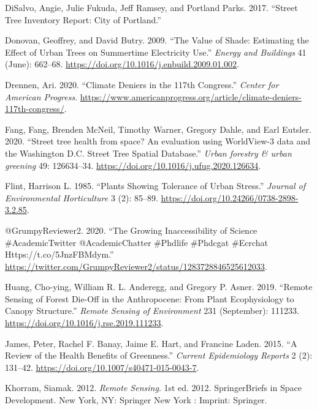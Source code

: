 \documentclass[12pt,twoside]{reedthesis}
\newlength{\cslhangindent}
\newenvironment{CSLReferences}[2] %
 {%
  \setlength{\parindent}{0pt}
  \ifodd #1 \everypar{\setlength{\hangindent}{\cslhangindent}}\ignorespaces\fi
  \ifnum #2 > 0
  \setlength{\parskip}{#2\baselineskip}
  \fi
 }%
 {}
\begin{document}
\begin{CSLReferences}{1}{0}
\leavevmode{}%
DiSalvo, Angie, Julie Fukuda, Jeff Ramsey, and Portland Parks. 2017. {``Street Tree Inventory Report: City of Portland.''}

\leavevmode{}%
Donovan, Geoffrey, and David Butry. 2009. {``The Value of Shade: Estimating the Effect of Urban Trees on Summertime Electricity Use.''} \emph{Energy and Buildings} 41 (June): 662--68. \url{https://doi.org/10.1016/j.enbuild.2009.01.002}.

\leavevmode{}%
Drennen, Ari. 2020. {``Climate Deniers in the 117th Congress.''} \emph{Center for American Progress}. \url{https://www.americanprogress.org/article/climate-deniers-117th-congress/}.

\leavevmode{}%
Fang, Fang, Brenden McNeil, Timothy Warner, Gregory Dahle, and Earl Eutsler. 2020. {``Street tree health from space? An evaluation using WorldView-3 data and the Washington D.C. Street Tree Spatial Database.''} \emph{Urban forestry \& urban greening} 49: 126634--34. \url{https://doi.org/10.1016/j.ufug.2020.126634}.

\leavevmode{}%
Flint, Harrison L. 1985. {``Plants Showing Tolerance of Urban Stress.''} \emph{Journal of Environmental Horticulture} 3 (2): 85--89. \url{https://doi.org/10.24266/0738-2898-3.2.85}.

\leavevmode{}%
@GrumpyReviewer2. 2020. {``The Growing Inaccessibility of Science {\#}AcademicTwitter @AcademicChatter {\#}Phdlife {\#}Phdcgat {\#}Ecrchat Https://t.co/5JnzFBMdym.''} \url{https://twitter.com/GrumpyReviewer2/status/1283728846525612033}.

\leavevmode{}%
Huang, Cho-ying, William R. L. Anderegg, and Gregory P. Asner. 2019. {``Remote Sensing of Forest Die-Off in the Anthropocene: From Plant Ecophysiology to Canopy Structure.''} \emph{Remote Sensing of Environment} 231 (September): 111233. \url{https://doi.org/10.1016/j.rse.2019.111233}.

\leavevmode{}%
James, Peter, Rachel F. Banay, Jaime E. Hart, and Francine Laden. 2015. {``A Review of the Health Benefits of Greenness.''} \emph{Current Epidemiology Reports} 2 (2): 131--42. \url{https://doi.org/10.1007/s40471-015-0043-7}.

\leavevmode{}%
Khorram, Siamak. 2012. \emph{Remote Sensing}. 1st ed. 2012. SpringerBriefs in Space Development. New York, NY: Springer New York : Imprint: Springer.


\end{CSLReferences}
\end{document}

